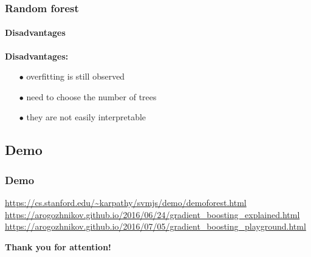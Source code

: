 \begin{frame}
	\frametitle{Random forest}
		\framesubtitle{Disadvantages}

		 \textbf{Disadvantages:}
		\begin{itemize}
		  \item[$\bullet$] overfitting is still observed 
		  \item[$\bullet$] need to choose the number of trees
		  \item[$\bullet$] they are not easily interpretable
		\end{itemize}

\end{frame}

\subsection{Demo} %
\begin{frame}
\frametitle{Demo}
\bigbreak
\bigbreak
\url{https://cs.stanford.edu/~karpathy/svmjs/demo/demoforest.html}\bigbreak
\url{https://arogozhnikov.github.io/2016/06/24/gradient_boosting_explained.html}\bigbreak
\url{https://arogozhnikov.github.io/2016/07/05/gradient_boosting_playground.html}
\end{frame}

\begin{frame}
	
	\begin{center}
		\Huge \textbf{Thank you for attention!}
	\end{center}

\end{frame}
